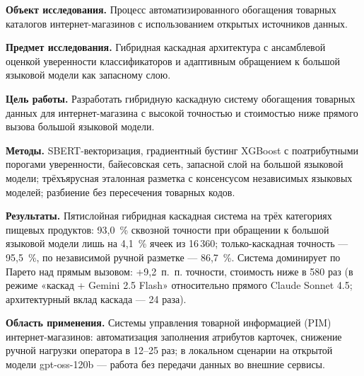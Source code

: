 \abstract
{}

\textbf{Объект исследования.} Процесс автоматизированного обогащения товарных каталогов интернет-магазинов с использованием открытых источников данных.

\textbf{Предмет исследования.} Гибридная каскадная архитектура с ансамблевой оценкой уверенности классификаторов и адаптивным обращением к большой языковой модели как запасному слою.

\textbf{Цель работы.} Разработать гибридную каскадную систему обогащения товарных данных для интернет-магазина с высокой точностью и стоимостью ниже прямого вызова большой языковой модели.

\textbf{Методы.} SBERT-векторизация, градиентный бустинг XGBoost с поатрибутными порогами уверенности, байесовская сеть, запасной слой на большой языковой модели; трёхъярусная эталонная разметка с консенсусом независимых языковых моделей; разбиение без пересечения товарных кодов.

\textbf{Результаты.} Пятислойная гибридная каскадная система на трёх категориях пищевых продуктов: 93,0~\% сквозной точности при обращении к большой языковой модели лишь на 4,1~\% ячеек из 16\,360; только-каскадная точность — 95,5~\%, по независимой ручной разметке — 86,7~\%. Система доминирует по Парето над прямым вызовом: +9,2~п.~п. точности, стоимость ниже в 580 раз (в режиме «каскад + Gemini 2.5 Flash» относительно прямого Claude Sonnet 4.5; архитектурный вклад каскада — 24 раза).

\textbf{Область применения.} Системы управления товарной информацией (PIM) интернет-магазинов: автоматизация заполнения атрибутов карточек, снижение ручной нагрузки оператора в 12–25 раз; в локальном сценарии на открытой модели gpt-oss-120b — работа без передачи данных во внешние сервисы.
